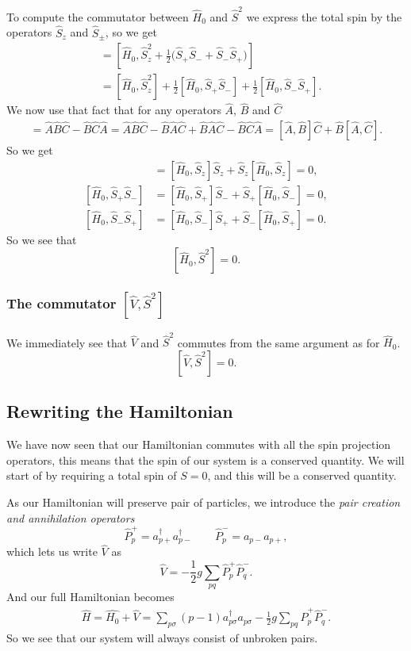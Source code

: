\documentclass[a4paper, 11pt, notitlepage, english]{article}
\newcommand{\op}[1]{\hat{#1}}
\begin{document}
To compute the commutator between $\op{H}_0$ and $\op{S}^2$ we express the total spin by the operators $\op{S}_z$ and $\op{S}_\pm$, so we get
\begin{align*}
[\op{H}_0, \op{S}^2] &= [\op{H}_0, \op{S}_z^2 + \frac{1}{2}\big(\op{S}_+\op{S}_- + \op{S}_-\op{S}_+\big)] \\
&= [\op{H}_0, \op{S}_z^2] + \frac{1}{2}[\op{H}_0, \op{S}_+\op{S}_-] + \frac{1}{2}[\op{H}_0, \op{S}_-\op{S}_+].
\end{align*}
We now use that fact that for any operators $\op{A}$, $\op{B}$ and $\op{C}$
\begin{align*}
[\op{A},\op{B}\op{C}] = \op{A}\op{B}\op{C} - \op{B}\op{C}\op{A} = \op{A}\op{B}\op{C} - \op{B}\op{A}\op{C} + \op{B}\op{A}\op{C} - \op{B}\op{C}\op{A} = [\op{A},\op{B}]\op{C} + \op{B}[\op{A},\op{C}].
\end{align*}
So we get
\begin{align*}
[\op{H}_0, \op{S}_z^2] &= [\op{H}_0, \op{S}_z]\op{S}_z + \op{S}_z[\op{H}_0, \op{S}_z] = 0, \\
[\op{H}_0, \op{S}_+\op{S}_-] &= [\op{H}_0, \op{S}_+]\op{S}_- + \op{S}_+[\op{H}_0, \op{S}_-] = 0, \\
[\op{H}_0, \op{S}_-\op{S}_+] &= [\op{H}_0, \op{S}_-]\op{S}_+ + \op{S}_-[\op{H}_0, \op{S}_+] = 0.
\end{align*}
So we see that 
$$[\op{H}_0, \op{S}^2] = 0.$$

\subsubsection*{The commutator $[\op{V}, \op{S}^2]$}

We immediately see that $\op{V}$ and $\op{S}^2$ commutes from the same argument as for $\op{H}_0$.
$$[\op{V}, \op{S}^2] = 0.$$

\subsection*{Rewriting the Hamiltonian}

We have now seen that our Hamiltonian commutes with all the spin projection operators, this means that the spin of our system is a conserved quantity. We will start of by requiring a total spin of $S=0$, and this will be a conserved quantity. 

As our Hamiltonian will preserve pair of particles, we introduce the \emph{pair creation and annihilation operators}
$$\op{P}_p^+ = a_{p+}^\dagger a_{p-}^\dagger \qquad \op{P}_p^- = a_{p-} a_{p+},$$
which lets us write $\op{V}$ as
$$\op{V} = -\frac{1}{2}g \sum_{pq} \op{P}_p^+ \op{P}_q^-.$$
And our full Hamiltonian becomes
\begin{align*}
	\op{H} = \op{H_0} + \op{V} = \sum_{p \sigma} (p-1)a_{p\sigma}^\dagger a_{p\sigma}-\frac{1}{2}g \sum_{pq} \op{P}_p^+ \op{P}_q^-.
\end{align*}
So we see that our system will always consist of unbroken pairs.
\end{document}
